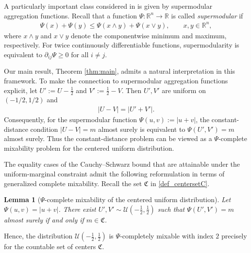 \documentclass{article}
\newtheorem{lemma}[theorem]{Lemma}
\newcommand{\R}{\mathbb{R}}
\newcommand{\cU}{\mathcal{U}}
\begin{document}
A particularly important class considered in \cite{bignozzi2015studying} is given by supermodular aggregation functions.
Recall that a function \(\Psi\colon\R^n\to\R\) is called \emph{supermodular} if
\begin{align*}
    \Psi(x)+\Psi(y)
    \leq
    \Psi(x\wedge y)+\Psi(x\vee y),
    \qquad x,y\in\R^n,
\end{align*}
where \(x\wedge y\) and \(x\vee y\) denote the componentwise minimum and maximum, respectively.
For twice continuously differentiable functions, supermodularity is equivalent to \(\partial_{ij}\Psi\geq0\) for all \(i\neq j\).

Our main result, Theorem \ref{thm:main}, admits a natural interpretation in this framework.
To make the connection to supermodular aggregation functions explicit, let \(U':=U-\frac12\) and \(V':=\frac12-V.\) Then \(U',V'\) are uniform on \((-1/2,1/2)\) and
\begin{align}\label{eq:centered-distance}
    |U-V|=|U'+V'|.
\end{align}
Consequently, for the supermodular function \(\Psi(u,v):=|u+v|\), the constant-distance condition \(|U-V|=m\) almost surely is equivalent to \(\Psi(U',V')=m\) almost surely.
Thus the constant-distance problem can be viewed as a \(\Psi\)-complete mixability problem for the centered uniform distribution.

The equality cases of the Cauchy--Schwarz bound that are attainable under the uniform-marginal constraint admit the following reformulation in terms of generalized complete mixability.
Recall the set \(\mathfrak{C}\) in \eqref{def_centersetC}.



\begin{lemma}[\(\Psi\)-complete mixability of the centered uniform distribution]
\label{lem:psi-mixability-centers}
Let \(\Psi(u,v)=|u+v|\).
There exist \(U',V'\sim\cU(-\tfrac12,\tfrac12)\) such that \(\Psi(U',V')=m\) almost surely if and only if \(m\in \mathfrak C\).
\end{lemma}


\noindent
Hence, the distribution \(\cU(-\tfrac12,\tfrac12)\) is \(\Psi\)-completely mixable with index \(2\) precisely for the countable set of centers \(\mathfrak C\).
\end{document}

